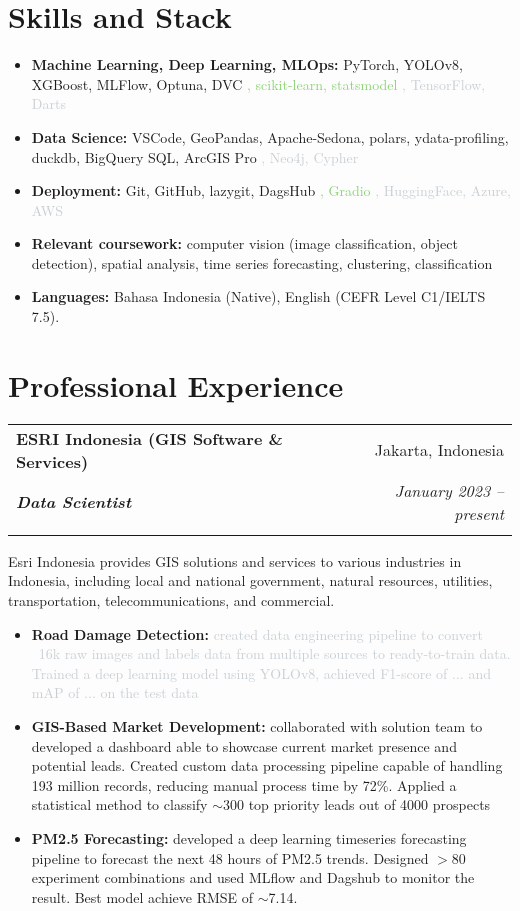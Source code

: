 \documentclass[a4paper, 11pt]{article}
\makeatletter
\newcommand{\resumeItem}[2]{
    \item\small{
        \textbf{#1}{#2 \vspace{-2pt}}
    }
}
\newcommand{\resumeSubheading}[4]{
    \vspace{-1pt}
    \begin{tabular*}{\textwidth}{l@{\extracolsep{\fill}}r}
        \color{lightblue}\textbf{#1} & #2 \\
        \textbf{\textit{\small#3}} & \textit{\small #4} \\
        \textnormal{}\vspace{-5pt}
    \end{tabular*}\vspace{-5pt}
}
\newcommand{\resumeItemListStart}{\begin{itemize}[leftmargin=*]\setlength\itemsep{0em}\vspace{-1pt}}
\newcommand{\resumeItemListEnd}{\end{itemize}\vspace{-5pt}}
\makeatother
\begin{document}
    \section{Skills and Stack}
    \resumeItemListStart
    \resumeItem{Machine Learning, Deep Learning, MLOps:}{
        PyTorch, YOLOv8, XGBoost, MLFlow, Optuna, DVC
        \textcolor[HTML]{8bd274}{, scikit-learn, statsmodel} %
        \textcolor[HTML]{C8cfd4}{, TensorFlow, Darts} %
    }
    \resumeItem{Data Science:}{
        VSCode, GeoPandas, Apache-Sedona, polars, ydata-profiling,
        duckdb, BigQuery SQL, ArcGIS Pro
        \textcolor[HTML]{C8cfd4}{, Neo4j, Cypher}
    }
    \resumeItem{Deployment:}{
        Git, GitHub, lazygit, DagsHub
        \textcolor[HTML]{8bd274}{, Gradio}
        \textcolor[HTML]{C8cfd4}{, HuggingFace, Azure, AWS}
    }
    \resumeItem{Relevant coursework:}{
        computer vision (image classification, object detection),
        spatial analysis,
        time series forecasting,
        clustering,
        classification
    }
    \resumeItem{Languages:}{
        Bahasa Indonesia (Native), 
        English (CEFR Level C1/IELTS 7.5).
    }
    \resumeItemListEnd
	
    \vspace{-5pt}
    \section{Professional Experience}
    \resumeSubheading
    {ESRI Indonesia (GIS Software \& Services)}{Jakarta, Indonesia}
    {Data Scientist}{January 2023 – present}
    {Esri Indonesia provides GIS solutions and services to various industries in 
    Indonesia, including local and national government, natural resources, utilities, 
    transportation, telecommunications, and commercial.}
    \vspace{-5pt}
    \resumeItemListStart
    \resumeItem{Road Damage Detection:}{\textcolor[HTML]{C8cfd4}{ created data engineering pipeline to convert
    ~16k raw images and labels data from multiple sources to ready-to-train data. Trained
    a deep learning model using YOLOv8, achieved F1-score of ... and mAP of ... on 
    the test data}
    }
    \resumeItem{GIS-Based Market Development:}{ collaborated with solution team to 
    developed a dashboard able to showcase current market presence and potential leads. 
    Created custom data processing pipeline capable of handling 193 million records, 
    reducing manual process time by 72\%. Applied a statistical method to classify 
    $\sim$300 top priority leads out of 4000 prospects
    }
    \resumeItem{PM2.5 Forecasting:}{ developed a deep learning 
    timeseries forecasting pipeline to forecast the next 48 hours of PM2.5 trends. 
    Designed $>$80 experiment combinations and used MLflow and Dagshub to monitor the 
    result. Best model achieve RMSE of $\sim$7.14.
    }
    \resumeItemListEnd
\end{document}
